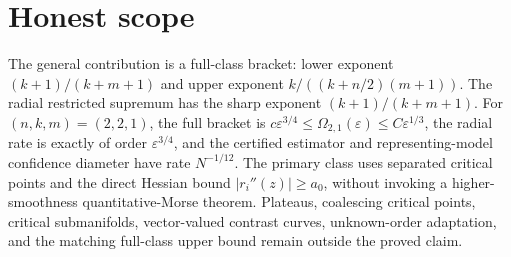\documentclass{article}
\begin{document}
\section{Honest scope}

The general contribution is a full-class bracket: lower exponent \((k+1)/(k+m+1)\) and upper exponent \(k/((k+n/2)(m+1))\). The radial restricted supremum has the sharp exponent \((k+1)/(k+m+1)\). For \((n,k,m)=(2,2,1)\), the full bracket is \(c\varepsilon^{3/4}\leq\Omega_{2,1}(\varepsilon)\leq C\varepsilon^{1/3}\), the radial rate is exactly of order \(\varepsilon^{3/4}\), and the certified estimator and representing-model confidence diameter have rate \(N^{-1/12}\). The primary class uses separated critical points and the direct Hessian bound \(|r_i''(z)|\geq a_0\), without invoking a higher-smoothness quantitative-Morse theorem. Plateaus, coalescing critical points, critical submanifolds, vector-valued contrast curves, unknown-order adaptation, and the matching full-class upper bound remain outside the proved claim.
\end{document}
